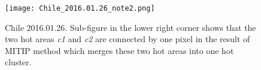 \begin{figure}[!htbp]
\centering
\texttt{[image: Chile\_2016.01.26\_note2.png]}
\caption{Chile 2016.01.26. Sub-figure in the lower right corner shows that the two hot areas \emph{c1} and \emph{c2} are connected by one pixel in the result of MITIP method which merges these two hot areas into one hot cluster.}
\label{fig:Chile_comp2}
\end{figure}






